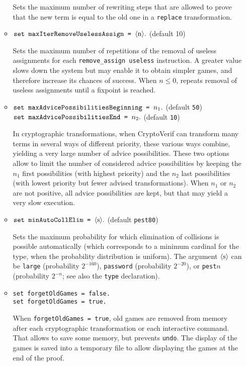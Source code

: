\begin{itemize}
\begin{itemize}
Sets the maximum number of rewriting steps that are allowed 
to prove that the new term is equal to the old one in a 
\texttt{replace} transformation. 

\item $\texttt{set maxIterRemoveUselessAssign = }\langle\textrm{n}\rangle{\tt .}$ (default 10)

Sets the maximum number of repetitions of the removal of useless assignments 
for each {\tt remove\string_assign useless} instruction.
A greater value slows down the system but may enable it to obtain
simpler games, and therefore increase its chances of success.
When $n \leq 0$, repeats removal of useless assignments until a fixpoint 
is reached.

\item $\texttt{set maxAdvicePossibilitiesBeginning = }n_1{\tt .}$ (default \texttt{50})\\
$\texttt{set maxAdvicePossibilitiesEnd = }n_2{\tt .}$ (default \texttt{10})

In cryptographic transformations, when CryptoVerif can transform many terms in several ways of different priority, these various ways combine, yielding a very large number of advice possibilities. These two options allow to limit the number of considered advice possibilities by keeping the $n_1$ first possibilities (with highest priority) and the $n_2$ last possibilities (with lowest priority but fewer advised transformations). When $n_1$ or $n_2$ are not positive, all advice possibilities are kept, but that may yield a very slow execution. 

\item $\texttt{set minAutoCollElim = }\langle\textrm{s}\rangle{\tt .}$ (default \texttt{pest80})

  Sets the maximum probability for which elimination of collisions is
  possible automatically (which corresponds to a minimum cardinal for
  the type, when the probability distribution is uniform).  The argument
  $\langle\textrm{s}\rangle$ can be \texttt{large} (probability $2^{-160}$),
  \texttt{password} (probability $2^{-20}$), or \texttt{pest}$n$
  (probability $2^{-n}$; see also the \texttt{type} declaration).

\item \texttt{set forgetOldGames = false.}\\
\texttt{set forgetOldGames = true.}

When \texttt{forgetOldGames = true}, old games are removed from memory after each
cryptographic transformation or each interactive command.  
That allows to save some memory, but prevents \texttt{undo}.
The display of the games is saved into a temporary file to allow
displaying the games at the end of the proof.


\end{itemize}
\end{itemize}
